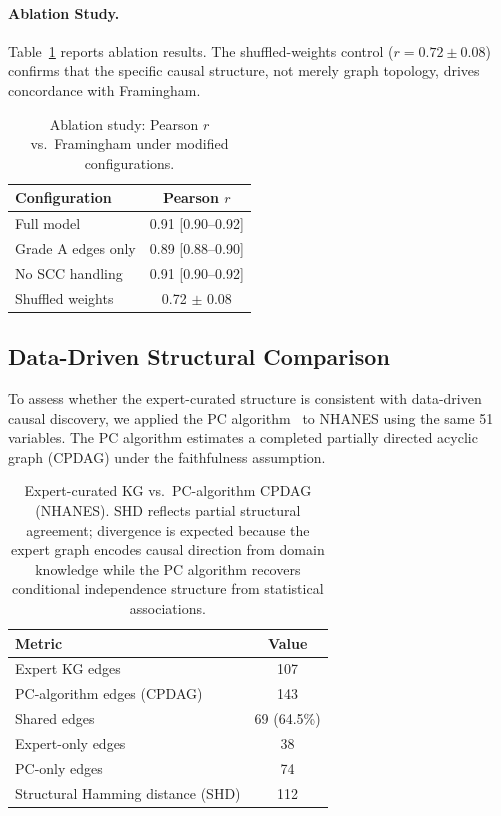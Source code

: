 \documentclass[runningheads]{llncs}
\begin{document}
\paragraph{Ablation Study.}\label{sec:ablation}
Table~\ref{tab:ablation} reports ablation results.  The
shuffled-weights control ($r = 0.72 \pm 0.08$) confirms that the
specific causal structure, not merely graph topology, drives
concordance with Framingham.

\begin{table}[t]
\centering
\caption{Ablation study: Pearson $r$ vs.\ Framingham under
modified configurations.}\label{tab:ablation}
\small
\begin{tabular}{@{}lc@{}}
\toprule
\textbf{Configuration} & \textbf{Pearson $r$} \\
\midrule
Full model           & 0.91 [0.90--0.92] \\
Grade A edges only   & 0.89 [0.88--0.90] \\
No SCC handling      & 0.91 [0.90--0.92] \\
Shuffled weights     & 0.72 $\pm$ 0.08 \\
\bottomrule
\end{tabular}
\end{table}

\subsection{Data-Driven Structural Comparison}\label{sec:pcalg}

To assess whether the expert-curated structure is consistent with
data-driven causal discovery, we applied the PC
algorithm~\cite{spirtes2000causation} to NHANES using the same 51
variables.  The PC algorithm estimates a completed partially directed
acyclic graph (CPDAG) under the faithfulness assumption.

\begin{table}[t]
\centering
\caption{Expert-curated KG vs.\ PC-algorithm CPDAG (NHANES).
SHD reflects partial structural agreement; divergence is expected
because the expert graph encodes causal direction from domain
knowledge while the PC algorithm recovers conditional independence
structure from statistical associations.}\label{tab:pcalg}
\small
\begin{tabular}{@{}lc@{}}
\toprule
\textbf{Metric} & \textbf{Value} \\
\midrule
Expert KG edges                     & 107 \\
PC-algorithm edges (CPDAG)          & 143 \\
Shared edges                        & 69 (64.5\%) \\
Expert-only edges                   & 38 \\
PC-only edges                       & 74 \\
Structural Hamming distance (SHD)   & 112 \\
\bottomrule
\end{tabular}
\end{table}
\end{document}
